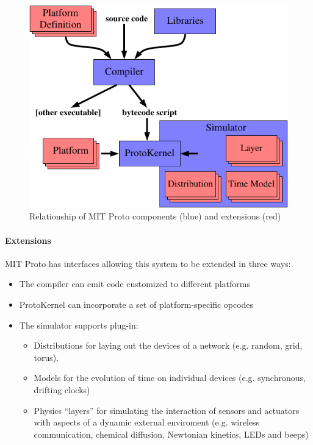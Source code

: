 \documentclass{article}
\begin{document}
\begin{figure}
\centering
\includegraphics{figures/components.pdf}
\caption{Relationship of MIT Proto components (blue) and extensions (red)}
\label{f:components}
\end{figure}




\paragraph{Extensions}
MIT Proto has interfaces allowing this system to be extended in three
ways:
\begin{itemize}
\item The compiler can emit code customized to different platforms
\item ProtoKernel can incorporate a set of platform-specific opcodes 
\item The simulator supports plug-in:
  \begin{itemize}
    \item Distributions for laying out the devices of a network (e.g.
      random, grid, torus).
    \item Models for the evolution of time on individual devices (e.g. 
      synchronous, drifting clocks)
    \item Physics ``layers'' for simulating the interaction of sensors
      and actuators with aspects of a dynamic external enviroment
      (e.g. wireless communication, chemical diffusion, Newtonian
      kinetics, LEDs and beeps)
  \end{itemize}
\end{itemize}
\end{document}

